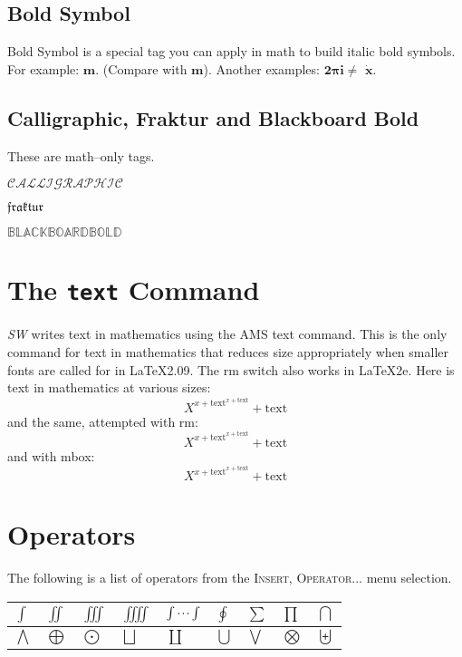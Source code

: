\documentclass{article}
\begin{document}
\subsection{Bold Symbol}

Bold Symbol is a special tag you can apply in math to build italic bold
symbols. For example: $\boldsymbol{m}$. (Compare with $\mathbf{m}$). Another
examples: $\boldsymbol{2\pi i\neq }$ $\boldsymbol{\dot{x}}$.

\subsection{Calligraphic, Fraktur and Blackboard Bold}

These are math--only tags.

$\mathcal{CALLIGRAPHIC}$

$\mathfrak{fraktur}$

$\mathbb{BLACKBOARDBOLD}$

\section{The \texttt{\TEXTsymbol{\backslash}text} Command}

\textsl{SW} writes text in mathematics using the AMS \TEXTsymbol{\backslash}%
text command. This is the only command for text in mathematics that reduces
size appropriately when smaller fonts are called for in \LaTeX{}2.09. The 
\TEXTsymbol{\backslash}rm switch also works in \LaTeX{}2e. Here is text in
mathematics at various sizes: 
\begin{equation*}
X^{x+\text{text}^{x+\text{text}}}+\text{text}
\end{equation*}
and the same, attempted with \TEXTsymbol{\backslash}rm: 
\begin{equation*}
X^{x+\mathrm{text}^{x+\mathrm{text}}}+\mathrm{text}
\end{equation*}
and with \TEXTsymbol{\backslash}mbox: 
\begin{equation*}
X^{x+\mbox{text}^{x+\mbox{text}}}+\mbox{text}
\end{equation*}

\section{Operators}

The following is a list of operators from the \textsc{Insert, Operator}...
menu selection.

\begin{tabular}{|l|l|l|l|l|l|l|l|l|}
\hline
$\int $ & $\iint $ & $\iiint $ & $\iiiint $ & $\idotsint $ & $\oint $ & $%
\sum $ & $\prod $ & $\bigcap $ \\ \hline
$\bigwedge $ & $\bigoplus $ & $\bigodot $ & $\bigsqcup $ & $\coprod $ & $%
\bigcup $ & $\bigvee $ & $\bigotimes $ & $\biguplus $ \\ \hline
\end{tabular}
\end{document}
